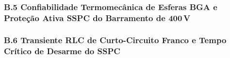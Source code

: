\vspace{0.6cm}
\subsubsection*{B.5 Confiabilidade Termomecânica de Esferas BGA e Proteção Ativa SSPC do Barramento de 400\,V}


\vspace{0.6cm}
\subsubsection*{B.6 Transiente RLC de Curto-Circuito Franco e Tempo Crítico de Desarme do SSPC}
